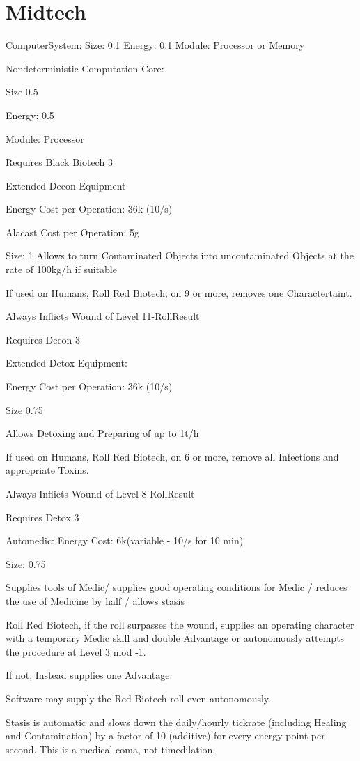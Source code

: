 \section{Midtech}\label{sec:midtech}
ComputerSystem:
Size: 0.1
Energy: 0.1
Module: Processor or Memory\par
\par
Nondeterministic Computation Core:\par
Size 0.5\par
Energy: 0.5\par
Module: Processor\par
Requires Black Biotech 3\par
\par
Extended Decon Equipment\par
Energy Cost per Operation: 36k (10/s)\par
Alacast Cost per Operation: 5g\par
Size: 1
Allows to turn Contaminated Objects into uncontaminated Objects at the rate of 100kg/h if suitable\par
If used on Humans, Roll Red Biotech, on 9 or more, removes one Charactertaint.\par
Always Inflicts Wound of Level 11-RollResult\par
Requires Decon 3\par
\par
Extended Detox Equipment:\par
Energy Cost per Operation: 36k (10/s)\par
Size 0.75\par
Allows Detoxing and Preparing of up to 1t/h\par
If used on Humans, Roll Red Biotech, on 6 or more, remove all Infections and appropriate Toxins.\par
Always Inflicts Wound of Level 8-RollResult\par
Requires Detox 3\par
Automedic:
Energy Cost: 6k(variable - 10/s for 10 min)\par
Size: 0.75\par
Supplies tools of Medic/ supplies good operating conditions for Medic / reduces the use of Medicine by half / allows stasis\par
Roll Red Biotech, if the roll surpasses the wound, supplies an operating character with a temporary Medic skill and
double Advantage or autonomously attempts the procedure at Level 3 mod -1.\par
If not, Instead supplies one Advantage.\par
Software may supply the Red Biotech roll even autonomously.\par
Stasis is automatic and slows down the daily/hourly tickrate (including Healing and Contamination) by a factor of 10
(additive) for every energy point per second.
This is a medical coma, not timedilation.
